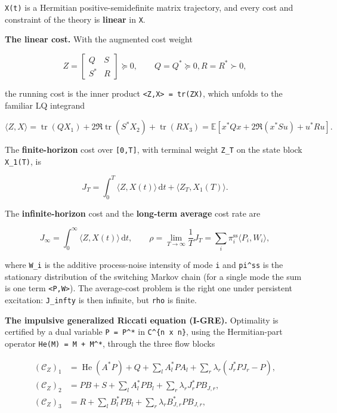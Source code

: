 \documentclass[11pt,oneside]{report}
\newcommand{\code}[1]{\texttt{#1}}
\begin{document}
\code{X(t)} is a Hermitian positive-semidefinite matrix trajectory, and every cost
and constraint of the theory is \textbf{linear} in \code{X}.

\textbf{The linear cost.} With the augmented cost weight

\[
Z = \begin{bmatrix} Q & S \\ S^{*} & R \end{bmatrix} \succeq 0,
\qquad Q = Q^{*} \succeq 0,  R = R^{*} \succ 0,
\]

the running cost is the inner product \code{\textless{}Z,X\textgreater{} = tr(ZX)}, which unfolds to the
familiar LQ integrand

\[
\langle Z, X\rangle = \operatorname{tr}(Q X_1) + 2 \Re\operatorname{tr}(S^{*} X_2)
   + \operatorname{tr}(R X_3)
   = \mathbb{E}\left[ x^{*}Q x + 2 \Re(x^{*}S u) + u^{*}R u \right].
\]

The \textbf{finite-horizon} cost over \code{[0,T]}, with terminal weight \code{Z\_T} on the
state block \code{X\_1(T)}, is

\[
J_T = \int_{0}^{T} \langle Z, X(t)\rangle\,\mathrm{d}t
      + \langle Z_T, X_1(T)\rangle .
\]

The \textbf{infinite-horizon} cost and the \textbf{long-term average} cost rate are

\[
J_\infty = \int_{0}^{\infty} \langle Z, X(t)\rangle\,\mathrm{d}t ,
\qquad
\rho = \lim_{T\to\infty} \frac{1}{T} J_T
     = \sum_{i} \pi_i^{\mathrm{ss}} \langle P_i, W_i\rangle ,
\]

where \code{W\_i} is the additive process-noise intensity of mode \code{i} and
\code{pi\^{}ss} is the stationary distribution of the switching Markov chain (for a
single mode the sum is one term \code{\textless{}P,W\textgreater{}}). The average-cost problem is the right
one under persistent excitation: \code{J\_infty} is then infinite, but \code{rho} is
finite.

\textbf{The impulsive generalized Riccati equation (I-GRE).} Optimality is certified
by a dual variable \code{P = P\^{}*} in \code{C\^{}\{n x n\}}, using the Hermitian-part operator
\code{He(M) = M + M\^{}*}, through the three flow blocks

\[
\begin{aligned}
(\mathcal{C}_Z)_1 &= \operatorname{He}(A^{*}P) + Q
   + \textstyle\sum_l A_l^{*} P A_l
   + \textstyle\sum_r \lambda_r (J_r^{*} P J_r - P) , \\
(\mathcal{C}_Z)_2 &= P B + S
   + \textstyle\sum_l A_l^{*} P B_l
   + \textstyle\sum_r \lambda_r J_r^{*} P B_{J,r} , \\
(\mathcal{C}_Z)_3 &= R
   + \textstyle\sum_l B_l^{*} P B_l
   + \textstyle\sum_r \lambda_r B_{J,r}^{*} P B_{J,r} ,
\end{aligned}
\]
\end{document}
